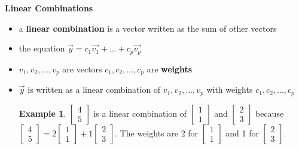 \documentclass[a4paper,12pt]{article}
\theoremstyle{definition}
\theoremstyle{definition}
\newtheorem{example}{Example}[subsection]
\begin{document}
	\textbf{Linear Combinations}
	\begin{itemize}
		\item a \textbf{linear combination} is a vector written as the sum of other vectors
		\item the equation $\vec{y} = c_1\vec{v_1} + \ldots + c_p\vec{v_p}$
		\item $v_1,v_2,...,v_p$ are vectors $c_1,c_2,...,c_p$ are \textbf{weights}
		\item $\vec{y}$ is written as a linear combination of $v_1,v_2,...,v_p$ with weights $c_1,c_2,...,c_p$
		
		\begin{example}
			$\begin{bmatrix}
				4\\
				5
			\end{bmatrix}$
			is a linear combination of
			$\begin{bmatrix}
				1\\
				1
			\end{bmatrix}$
			and
			$\begin{bmatrix}
				2\\
				3
			\end{bmatrix}$
			because
			$\begin{bmatrix}
				4\\
				5
			\end{bmatrix}
			=
			2
			\begin{bmatrix}
				1\\
				1
			\end{bmatrix}
			+
			1
			\begin{bmatrix}
				2\\
				3
			\end{bmatrix}$.
			The weights are 2 for
			$\begin{bmatrix}
				1\\
				1
			\end{bmatrix}$
			and 1 for
			$\begin{bmatrix}
				2\\
				3
			\end{bmatrix}$.
		\end{example}
	\end{itemize}
	
\end{document}
